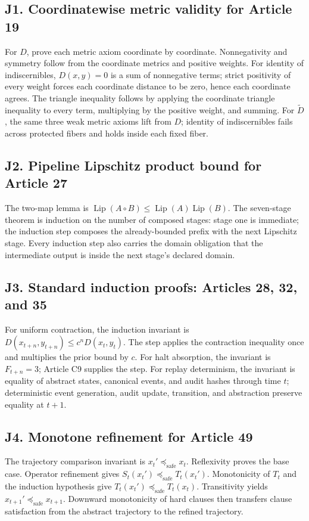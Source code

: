 \documentclass[10pt,oneside]{article}
\theoremstyle{definition}
\theoremstyle{remark}
\newcommand{\Lip}{\operatorname{Lip}}
\newcommand{\safe}{\mathrm{safe}}
\begin{document}
\subsection*{J1. Coordinatewise metric validity for Article 19}
For \(D\), prove each metric axiom coordinate by coordinate. Nonnegativity and symmetry follow from the coordinate metrics and positive weights. For identity of indiscernibles, \(D(x,y)=0\) is a sum of nonnegative terms; strict positivity of every weight forces each coordinate distance to be zero, hence each coordinate agrees. The triangle inequality follows by applying the coordinate triangle inequality to every term, multiplying by the positive weight, and summing. For \(\widetilde D\), the same three weak metric axioms lift from \(D\); identity of indiscernibles fails across protected fibers and holds inside each fixed fiber.

\subsection*{J2. Pipeline Lipschitz product bound for Article 27}
The two-map lemma is \(\Lip(A\circ B)\leq \Lip(A)\Lip(B)\). The seven-stage theorem is induction on the number of composed stages: stage one is immediate; the induction step composes the already-bounded prefix with the next Lipschitz stage. Every induction step also carries the domain obligation that the intermediate output is inside the next stage's declared domain.

\subsection*{J3. Standard induction proofs: Articles 28, 32, and 35}
For uniform contraction, the induction invariant is \(D(x_{t+n},y_{t+n})\leq c^nD(x_t,y_t)\). The step applies the contraction inequality once and multiplies the prior bound by \(c\). For halt absorption, the invariant is \(F_{t+n}=3\); Article C9 supplies the step. For replay determinism, the invariant is equality of abstract states, canonical events, and audit hashes through time \(t\); deterministic event generation, audit update, transition, and abstraction preserve equality at \(t+1\).

\subsection*{J4. Monotone refinement for Article 49}
The trajectory comparison invariant is \(x_t'\preceq_{\safe}x_t\). Reflexivity proves the base case. Operator refinement gives \(S_t(x_t')\preceq_{\safe}T_t(x_t')\). Monotonicity of \(T_t\) and the induction hypothesis give \(T_t(x_t')\preceq_{\safe}T_t(x_t)\). Transitivity yields \(x_{t+1}'\preceq_{\safe}x_{t+1}\). Downward monotonicity of hard clauses then transfers clause satisfaction from the abstract trajectory to the refined trajectory.
\end{document}
